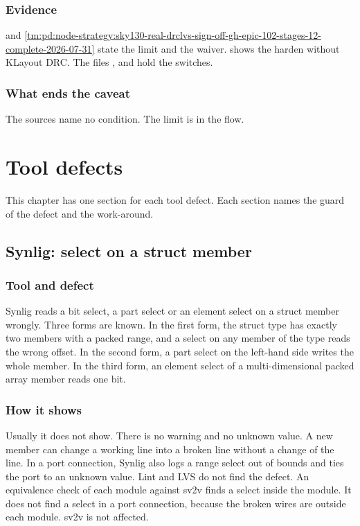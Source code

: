 \subsection*{Evidence}
 and \cref{tm:pd:node-strategy:sky130-real-drclvs-sign-off-gh-epic-102-stages-12-complete-2026-07-31} state the limit and the waiver.  shows the harden without KLayout DRC. The files ,  and  hold the switches.

\subsection*{What ends the caveat}
The sources name no condition. The limit is in the flow.

\chapter{Tool defects}\label{tm:ch:tool-defects}

This chapter has one section for each tool defect. Each section names the guard of the defect and the work-around.

\section{Synlig: select on a struct member}\label{tm:defect:synlig-struct-member-select}
\subsection*{Tool and defect}
Synlig reads a bit select, a part select or an element select on a struct member wrongly. Three forms are known. In the first form, the struct type has exactly two members with a packed range, and a select on any member of the type reads the wrong offset. In the second form, a part select on the left-hand side writes the whole member. In the third form, an element select of a multi-dimensional packed array member reads one bit.

\subsection*{How it shows}
Usually it does not show. There is no warning and no unknown value. A new member can change a working line into a broken line without a change of the line. In a port connection, Synlig also logs a range select out of bounds and ties the port to an unknown value. Lint and LVS do not find the defect. An equivalence check of each module against sv2v finds a select inside the module. It does not find a select in a port connection, because the broken wires are outside each module. sv2v is not affected.

